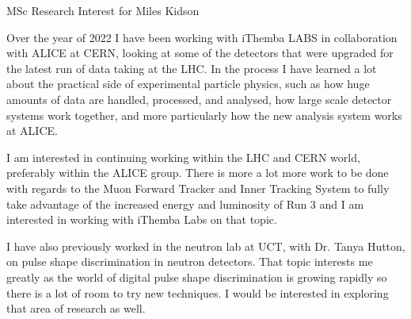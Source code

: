 \documentclass[11pt]{article}
\numberwithin{equation}{section}
\numberwithin{figure}{section}
\numberwithin{table}{section}
\begin{document}
\begin{center}
    {\Large MSc Research Interest for Miles Kidson}

\end{center}

Over the year of 2022 I have been working with iThemba LABS in collaboration with ALICE at CERN, looking at some of the detectors that were upgraded for the latest run of data taking at the LHC. In the process I have learned a lot about the practical side of experimental particle physics, such as how huge amounts of data are handled, processed, and analysed, how large scale detector systems work together, and more particularly how the new analysis system works at ALICE.

I am interested in continuing working within the LHC and CERN world, preferably within the ALICE group. There is more a lot more work to be done with regards to the Muon Forward Tracker and Inner Tracking System to fully take advantage of the increased energy and luminosity of Run 3 and I am interested in working with iThemba Labs on that topic. 

I have also previously worked in the neutron lab at UCT, with Dr. Tanya Hutton, on pulse shape discrimination in neutron detectors. That topic interests me greatly as the world of digital pulse shape discrimination is growing rapidly so there is a lot of room to try new techniques. I would be interested in exploring that area of research as well.
\end{document}
